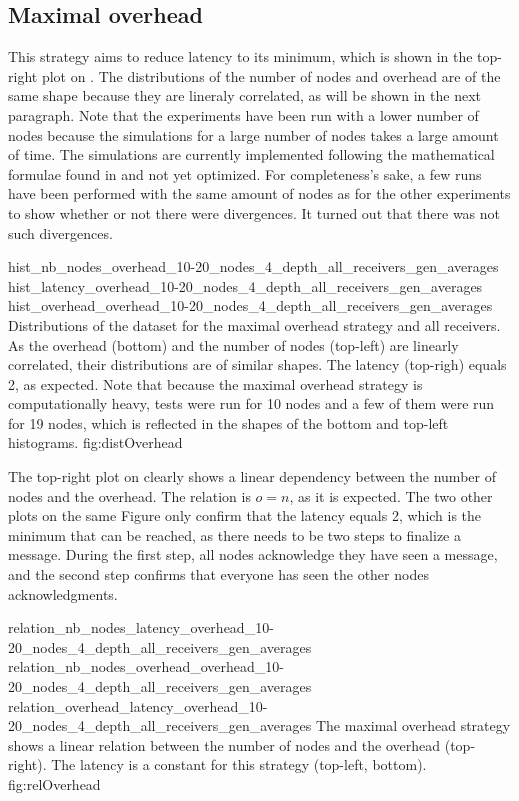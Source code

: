 \FloatBarrier
\subsection{Maximal overhead}
This strategy aims to reduce latency to its minimum, which is shown in the
top-right plot on . The distributions of the number
of nodes and overhead are of the same shape because they are lineraly
correlated, as will be shown in the next paragraph. 
Note that the experiments have been run with a lower number of nodes because the
simulations for a large number of nodes takes a large amount of time. The
simulations are currently implemented following the mathematical formulae found
in  and not yet optimized. For completeness's sake, a few runs
have been performed with the same amount of nodes as for the other experiments
to show whether or not there were divergences. It turned out that there was not
such divergences. 

\triplefigure
    {hist_nb_nodes_overhead_10-20_nodes_4_depth_all_receivers_gen_averages}
    {hist_latency_overhead_10-20_nodes_4_depth_all_receivers_gen_averages}
    {hist_overhead_overhead_10-20_nodes_4_depth_all_receivers_gen_averages}
    {Distributions of the dataset for the maximal overhead strategy and all
    receivers. As the overhead (bottom) and the number of nodes (top-left) are
    linearly correlated, their distributions are of similar shapes. The
    latency (top-righ) equals 2, as expected. Note that because the maximal
    overhead strategy is computationally heavy, tests were run for 10 nodes and
    a few of them were run for 19 nodes, which is reflected in the shapes of the
    bottom and top-left histograms.}
    {fig:distOverhead}

The top-right plot on  clearly shows a linear
dependency between the number of nodes and the overhead. The relation is \(o =
n\), as it is expected.
The two other plots on the same Figure only confirm that the latency equals 2,
which is the minimum that can be reached, as there needs to be two steps to
finalize a message. During the first step, all nodes acknowledge they have seen
a message, and the second step confirms that everyone has seen the other nodes
acknowledgments.

\triplefigure
    {relation_nb_nodes_latency_overhead_10-20_nodes_4_depth_all_receivers_gen_averages}
    {relation_nb_nodes_overhead_overhead_10-20_nodes_4_depth_all_receivers_gen_averages}
    {relation_overhead_latency_overhead_10-20_nodes_4_depth_all_receivers_gen_averages}
    {The maximal overhead  strategy shows a linear relation between the number of
    nodes and the overhead (top-right). The latency is a constant for this
    strategy (top-left, bottom).}
    {fig:relOverhead}

